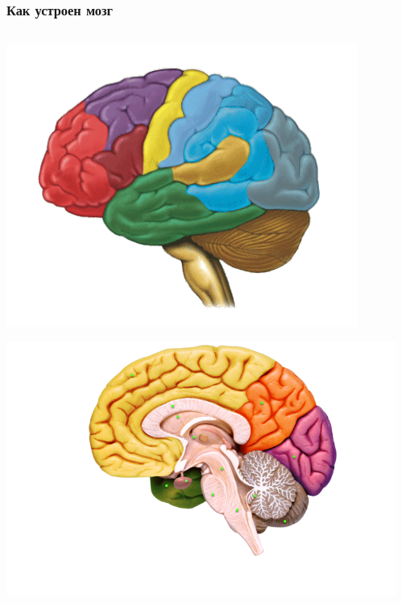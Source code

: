 \documentclass[default]{beamer}
\begin{document}
	\begin{frame}
		\frametitle{Как устроен мозг}
		
		\begin{columns}
			\begin{column}{0.3\textwidth}
				\includegraphics[width=0.9\textwidth]{phisio/mozg_2}
				\par\bigskip
				\hspace{-7mm}\includegraphics[width=1.1\textwidth]{phisio/mozg}
			\end{column}
			\begin{column}{0.4\textwidth}

\end{column}
\end{columns}
\end{frame}
\end{document}
